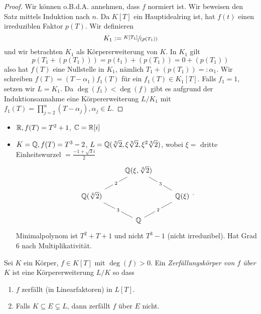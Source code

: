 \begin{proof}
	Wir können o.B.d.A. annehmen, dass $f$ normiert ist. Wir beweisen den Satz mittels Induktion nach $n$. Da $K[T]$ ein Hauptidealring ist, hat $f(t)$
	einen irreduziblen Faktor $p(T)$. Wir definieren
	\[
		K_1 := \sfrac{K[T_1]}{(p(T_1))}
	\]
	und wir betrachten $K_1$ als Körpererweiterung von $K$. In $K_1$ gilt
	\[
		p(T_1 + (p(T_1))) = p(t_1) + (p(T_1)) = 0 + (p(T_1))
	\] 
	also hat $f(T)$ eine Nullstelle in $K_1$, nämlich $T_1 + (p(T_1)) =: \alpha_1$.
	Wir schreiben $f(T) = (T-\alpha_1) f_1(T)$ für ein $f_1(T) \in K_1[T]$.
	Falls $f_1 = 1$, setzen wir $L = K_1$. Da $\deg(f_1) < \deg(f)$ gibt es aufgrund der Induktionsannahme eine Körpererweiterung $L / K_1$ mit
	$f_1(T) = \prod_{j=2}^{n} (T-\alpha_{j}), \alpha_{j} \in L$.
\end{proof}

\begin{eg}
	\begin{itemize}
		\item $\mathbb{R}, f(T) = T^2+1$, $\mathbb{C} = \mathbb{R}[i]$
		\item $K = \mathbb{Q}, f(T) = T^3 -2$, $L = \mathbb{Q}(\sqrt[3]{2}, \xi \sqrt[3]{2}, \xi^2 \sqrt[3]{2})$, wobei $\xi = $ dritte Einheitswurzel  $= \frac{-1+\sqrt{3} i}{2}$
			\[
			\begin{tikzcd}
                                                       & {\Q(\xi,\sqrt[3]{2})} \arrow[ld, "2" description, no head] \arrow[rd, "3" description, no head] &                                              \\
{\Q(\sqrt[3]{2})} \arrow[rd, "3" description, no head] &                                                                                                 & \Q(\xi) \arrow[ld, "2" description, no head] \\
                                                       & \Q                                                                                              &                                             
\end{tikzcd}
			.\] 
			Minimalpolynom ist $T^2 + T + 1$ und nicht $T^3 -1$ (nicht irreduzibel).
			Hat Grad $6$ nach Multiplikativität.
	\end{itemize}
\end{eg}

\begin{definition}
	Sei $K$ ein Körper, $f \in K[T]$ mit $\deg(f) > 0$.
	Ein \emph{Zerfällungskörper von $f$ über $K$ } ist eine Körpererweiterung $L / K$ so dass
	\begin{enumerate}[1)]
		\item $f$ zerfällt (in Linearfaktoren) in $L[T]$.
		\item Falls $K \subseteq E \subsetneq L$, dann zerfällt $f$ über $E$ nicht.
	\end{enumerate}
\end{definition}

